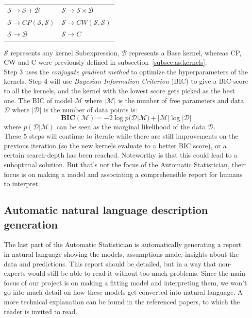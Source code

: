 \documentclass[a4paper, 10pt, conference]{ieeeconf}
\begin{document}
\begin{table}[!ht]
    \centering
    \begin{tabular}{ll}
        $\mathcal{S} \rightarrow \mathcal{S} + \mathcal{B}$   & $\mathcal{S} \rightarrow \mathcal{S} \times \mathcal{B}$ \\
        $\mathcal{S} \rightarrow CP(\mathcal{S},\mathcal{S})$ & $\mathcal{S} \rightarrow CW(\mathcal{S}, \mathcal{S})$   \\
        $\mathcal{S} \rightarrow \mathcal{B}$       & $\mathcal{S} \rightarrow C$         
    \end{tabular}
\end{table}

$\mathcal{S}$ represents any kernel Subexpression, $\mathcal{B}$ represents a Base kernel, whereas CP, CW and C were previously defined in subsection~\ref{subsec:as:kernels}.\\
Step 3 uses the \textit{conjugate gradient method} to optimize the hyperparameters of the kernels. Step 4 will use \textit{Bayesian Information Criterion} (BIC) \cite{schwarz1978estimating} to give a BIC-score to all the kernels, and the kernel with the lowest score gets picked as the best one. The BIC of model $\mathcal{M}$ where $|\mathcal{M}|$ is the number of free parameters and data $\mathcal{D}$ where $|\mathcal{D}|$ is the number of data points is:
\begin{equation}
    \label{eq:bic}
    \textbf{BIC}(\mathcal{M}) = -2 \log p(\mathcal{D}|\mathcal{M}) + |\mathcal{M}| \log |\mathcal{D}|
\end{equation}
where $p(\mathcal{D}|\mathcal{M})$ can be seen as the marginal likelihood of the data $\mathcal{D}$.\\

These 5 steps will continue to iterate while there are still improvements on the previous iteration (so the new kernels evaluate to a better BIC score), or a certain search-depth has been reached. Noteworthy is that this could lead to a suboptimal solution. But that's not the focus of the Automatic Statistician, their focus is on making a model and associating a comprehensible report for humans to interpret.

\subsection{Automatic natural language description generation}
The last part of the Automatic Statistician is automatically generating a report in natural language showing the models, assumptions made, insights about the data and predictions. This report should be detailed, but in a way that non-experts would still be able to read it without too much problems. Since the main focus of our project is on making a fitting model and interpreting them, we won't go into much detail on how these models get converted into natural language. A more technical explanation can be found in the referenced papers, to which the reader is invited to read.\\
\end{document}
